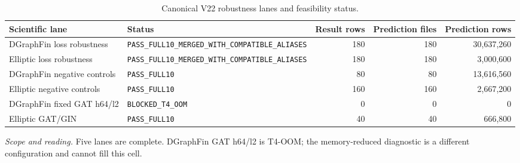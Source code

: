 \begin{table}[tbp]
\centering
\footnotesize
\setlength{\tabcolsep}{3.2pt}
\renewcommand{\arraystretch}{1.12}
\caption{Canonical V22 robustness lanes and feasibility status.}
\label{tab:s-v22-lanes-v2}
\begin{tabularx}{\textwidth}{@{}Y >{\raggedright\arraybackslash}p{0.21\textwidth} r r r@{}}
\toprule
\textbf{Scientific lane} & \textbf{Status} & \textbf{Result rows} & \textbf{Prediction files} & \textbf{Prediction rows} \\
\midrule
DGraphFin loss robustness & \texttt{PASS\_\allowbreak{}FULL10\_\allowbreak{}MERGED\_\allowbreak{}WITH\_\allowbreak{}COMPATIBLE\_\allowbreak{}ALIASES} & 180 & 180 & 30,637,260 \\
Elliptic loss robustness & \texttt{PASS\_\allowbreak{}FULL10\_\allowbreak{}MERGED\_\allowbreak{}WITH\_\allowbreak{}COMPATIBLE\_\allowbreak{}ALIASES} & 180 & 180 & 3,000,600 \\
DGraphFin negative controls & \texttt{PASS\_\allowbreak{}FULL10} & 80 & 80 & 13,616,560 \\
Elliptic negative controls & \texttt{PASS\_\allowbreak{}FULL10} & 160 & 160 & 2,667,200 \\
DGraphFin fixed GAT h64/l2 & \texttt{BLOCKED\_\allowbreak{}T4\_\allowbreak{}OOM} & 0 & 0 & 0 \\
Elliptic GAT/GIN & \texttt{PASS\_\allowbreak{}FULL10} & 40 & 40 & 666,800 \\
\bottomrule
\end{tabularx}
\vspace{2pt}
\begin{minipage}{\textwidth}\footnotesize\emph{Scope and reading.} Five lanes are complete. DGraphFin GAT h64/l2 is T4-OOM; the memory-reduced diagnostic is a different configuration and cannot fill this cell.\end{minipage}
\end{table}
